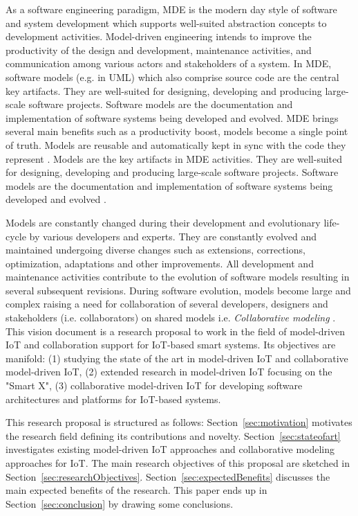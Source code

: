 As a software engineering paradigm, MDE is the modern day style of software and system development which supports well-suited abstraction concepts to development activities. Model-driven engineering intends to improve the productivity of the design and development, maintenance activities, and communication among various actors and stakeholders of a system. In MDE, software models (e.g. in UML) which also comprise source code are the central key artifacts. They are well-suited for designing, developing and producing large-scale software projects. Software models are the documentation and implementation of software systems being developed and evolved. MDE brings several main benefits such as a productivity boost, models become a single point of truth. Models are reusable and automatically kept in sync with the code they represent \cite{Fleurey+2011}. Models are the key artifacts in MDE activities. They are well-suited for designing, developing and producing large-scale software projects. Software models are the documentation and implementation of software systems being developed and evolved \cite{Kleppe+2003}.

Models are constantly changed during their development and evolutionary life-cycle by various developers and experts. They are constantly evolved and maintained undergoing diverse changes such as extensions, corrections, optimization, adaptations and other improvements. All development and maintenance activities contribute to the evolution of software models resulting in several subsequent revisions. During software evolution, models become large and complex raising a need for collaboration of several developers, designers and stakeholders (i.e. collaborators) on shared models i.e. \textit{Collaborative modeling} \cite{Kuryazov+2018}. This vision document is a research proposal to work in the field of model-driven IoT and collaboration support for IoT-based smart systems. Its objectives are manifold: (1) studying the state of the art in model-driven IoT and collaborative model-driven IoT, (2) extended research in model-driven IoT focusing on the "Smart X", (3) collaborative model-driven IoT for developing software architectures and platforms for IoT-based systems.

This research proposal is structured as follows: Section~\ref{sec:motivation} motivates the research field defining its contributions and novelty. Section~\ref{sec:stateofart} investigates existing model-driven IoT approaches and collaborative modeling approaches for IoT. The main research objectives of this proposal are sketched in Section~\ref{sec:researchObjectives}. Section~\ref{sec:expectedBenefits} discusses the main expected benefits of the research. This paper ends up in Section~\ref{sec:conclusion} by drawing some conclusions.